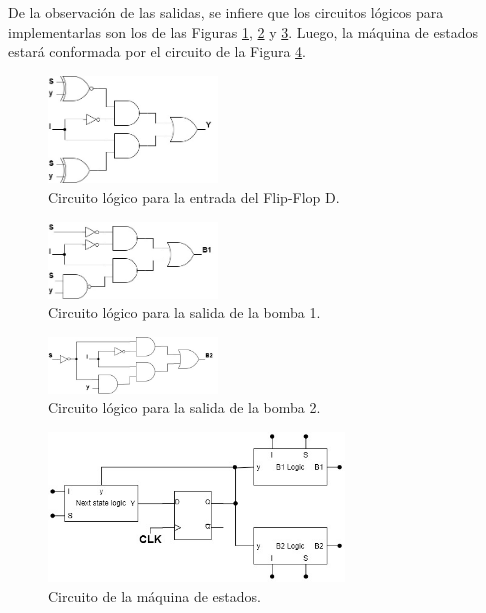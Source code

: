 De la observación de las salidas, se infiere que los circuitos lógicos para implementarlas son los de las Figuras \ref{fig:Y_logic_circuit_ex5}, 
\ref{fig:B1_logic_circuit_ex5} y \ref{fig:B2_logic_circuit_ex5}.
Luego, la máquina de estados estará conformada por el circuito de la Figura \ref{fig:fsm_circtuit_ex5}.
\begin{figure}[H]
    \centering
    \includegraphics[width=0.4\textwidth]{../EJ1/Recursos/Y_logic_circuit.jpg}
    \caption{Circuito lógico para la entrada del Flip-Flop D.}
    \label{fig:Y_logic_circuit_ex5}
\end{figure}
\begin{figure}[H]
    \centering
    \includegraphics[width=0.4\textwidth]{../EJ1/Recursos/B1_logic_circuit.jpg}
    \caption{Circuito lógico para la salida de la bomba 1.}
    \label{fig:B1_logic_circuit_ex5}
\end{figure}
\begin{figure}[H]
    \centering
    \includegraphics[width=0.4\textwidth]{../EJ1/Recursos/B2_logic_circuit.jpg}
    \caption{Circuito lógico para la salida de la bomba 2.}
    \label{fig:B2_logic_circuit_ex5}
\end{figure}
\begin{figure}[H]
    \centering
    \includegraphics[width=0.7\textwidth]{../EJ1/Recursos/fsm_circuit.jpg}
    \caption{Circuito de la máquina de estados.}
    \label{fig:fsm_circtuit_ex5}
\end{figure}



